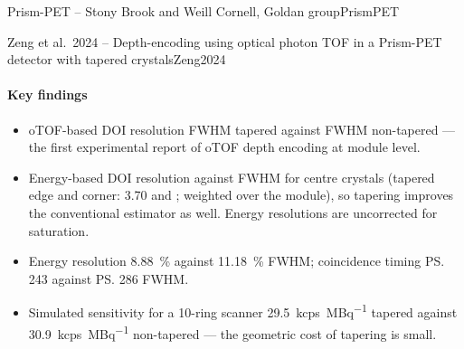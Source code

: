 \begin{programnote}{Prism-PET -- Stony Brook and Weill Cornell, Goldan group}{PrismPET}
\begin{papernote}{Zeng et al.\ 2024 -- Depth-encoding using optical photon TOF in a Prism-PET detector with tapered crystals}{Zeng2024}
\paragraph{Key findings}
\begin{itemize}
	\item oTOF-based DOI resolution  FWHM tapered against 
		FWHM non-tapered --- the first experimental report of oTOF depth
		encoding at module level.
	\item Energy-based DOI resolution  against  FWHM for
		centre crystals (tapered edge and corner: 3.70 and ; 
		weighted over the module), so tapering improves the conventional
		estimator as well. Energy resolutions are uncorrected for saturation.
	\item Energy resolution \qty{8.88}{\percent} against
		\qty{11.18}{\percent} FWHM; coincidence timing \ps{243} against
		\ps{286} FWHM.
	\item Simulated sensitivity for a 10-ring scanner
		\qty{29.5}{\kilo cps\per\mega\becquerel} tapered against
		\qty{30.9}{\kilo cps\per\mega\becquerel} non-tapered --- the geometric
		cost of tapering is small.
\end{itemize}


\end{papernote}
\end{programnote}
